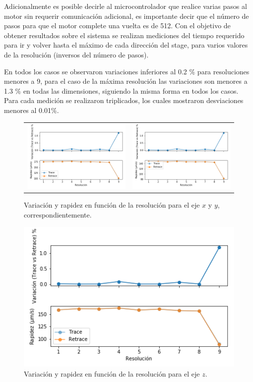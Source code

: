 Adicionalmente es posible decirle al microcontrolador que realice varias pasos al motor sin requerir comunicación adicional, es importante decir que el número de pasos para que el motor complete una vuelta es de 512. Con el objetivo de obtener resultados sobre el sistema se realizan mediciones del tiempo requerido para ir y volver hasta el máximo de cada dirección del stage, para varios valores de la resolución (inversos del número de pasos).

En todos los casos se observaron variaciones inferiores al 0.2 \% para resoluciones menores a 9, para el caso de la máxima resolución las variaciones son menores a 1.3 \% en todas las dimensiones, siguiendo la misma forma en todos los casos. Para cada medición se realizaron triplicados, los cuales mostraron desviaciones menores al 0.01\%.

\begin{figure}[h]
	\centering
	\begin{tabular}{cc}
		\includegraphics[width=0.5\linewidth]{figures/x.png} & 
		\includegraphics[width=0.5\linewidth]{figures/y.png}
	\end{tabular}
	\caption{Variación y rapidez en función de la resolución para el eje $x$ y $y$, correspondientemente.}
\end{figure}
\begin{figure}[h]
	\centering
	\includegraphics[width=0.45\linewidth]{figures/z.png}
	\caption{Variación y rapidez en función de la resolución para el eje $z$.}
\end{figure}


